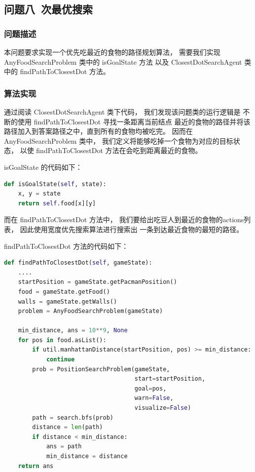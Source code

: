 \documentclass[12pt,onecolumn]{report}
\theoremstyle{plain}
\numberwithin{figure}{section}
\begin{document}
\subsection{问题八~次最优搜索}
\subsubsection{问题描述}
本问题要求实现一个优先吃最近的食物的路径规划算法，
需要我们实现 AnyFoodSearchProblem 类中的 isGoalState 方法
以及 ClosestDotSearchAgent 类中的 findPathToClosestDot 方法。

\subsubsection{算法实现}
通过阅读 ClosestDotSearchAgent 类下代码，
我们发现该问题类的运行逻辑是
不断的使用 findPathToClosestDot 寻找一条距离当前结点
最近的食物的路径并将该路径加入到答案路径之中，直到所有的食物均被吃完。
因而在 AnyFoodSearchProblem 类中，
我们定义将能够吃掉一个食物为对应的目标状态，
以使 findPathToClosestDot 方法在会吃到距离最近的食物。

isGoalState 的代码如下：
\begin{lstlisting}[language=python]
def isGoalState(self, state):
    x, y = state
    return self.food[x][y]
\end{lstlisting}

而在 findPathToClosestDot 方法中，
我们要给出吃豆人到最近的食物的actions列表，
因此使用宽度优先搜索算法进行搜索出
一条到达最近食物的最短的路径。

findPathToClosestDot 方法的代码如下：
\begin{lstlisting}[language=python]
def findPathToClosestDot(self, gameState):
    ....
    startPosition = gameState.getPacmanPosition()
    food = gameState.getFood()
    walls = gameState.getWalls()
    problem = AnyFoodSearchProblem(gameState)

    min_distance, ans = 10**9, None
    for pos in food.asList():
        if util.manhattanDistance(startPosition, pos) >= min_distance:
            continue
        prob = PositionSearchProblem(gameState,
                                     start=startPosition,
                                     goal=pos,
                                     warn=False,
                                     visualize=False)
        path = search.bfs(prob)
        distance = len(path)
        if distance < min_distance:
            ans = path
            min_distance = distance
    return ans
\end{lstlisting}
\end{document}
